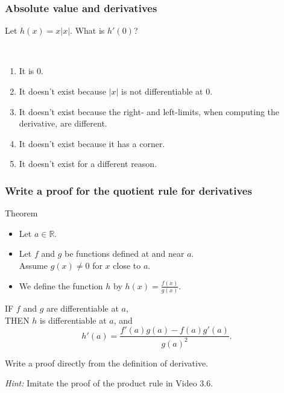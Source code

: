 \documentclass[14pt]{beamer}
\newcommand {\DS} [1] {${\displaystyle #1}$}
\newcommand {\R}{\mathbb{R}}
\newcommand{\setsize}[1]{\fontsize{#1}{#1}\selectfont} %
\newcommand{\smallerfont}{\setsize{13}} %
\begin{document}
\begin{frame}[t]
\frametitle{Absolute value and derivatives}

	Let $h(x) = x|x|$.  What is $h'(0)$?

\
\begin{enumerate}
	\item It is 0.
	\item It doesn't exist because $|x|$ is not differentiable at $0$.
	\item It doesn't exist because the right- and left-limits, when computing the derivative, are different.
	\item  It doesn't exist because it has a corner.
	\item It doesn't exist for a different reason.
\end{enumerate}


\end{frame}

\begin{frame}[t]
\smallerfont
\frametitle{Write a proof for the quotient rule for derivatives}

\begin{block}{Theorem}
\begin{itemize}
	\item Let $a \in \R$.
	\item  Let $f$ and $g$ be functions defined at and near $a$. \\
		Assume $g(x) \neq 0$ for $x$ close to $a$.
	\item  We define the function $h$ by  \DS{h(x) = \frac{f(x)}{g(x)}}.
\end{itemize}

IF $f$ and $g$ are differentiable at $a$, \\
THEN  $h$ is differentiable at $a$, and
	$$
		h'(a) =  \frac{f'(a) g(a) - f(a) g'(a)}{g(a)^2}.
	$$
\end{block}

\vfill


Write a proof directly from the definition of derivative.

\emph{Hint:} Imitate the proof of the product rule in  Video 3.6.

\end{frame}
\end{document}
